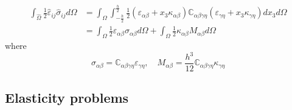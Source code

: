 \documentclass{article}
\begin{document}
\begin{equation}
    \begin{split}
        \int_{\hat \Omega}\frac{1}{2}\hat \varepsilon_{ij} \hat \sigma_{ij} d\Omega &= \int_{\Omega}\int_{-\frac{h}{2}}^{\frac{h}{2}}\frac{1}{2}(\varepsilon_{\alpha \beta} + x_3 \kappa_{\alpha \beta})\mathbb{C}_{\alpha \beta \gamma \eta}(\varepsilon_{\gamma \eta} + x_3 \kappa_{\gamma \eta})dx_3 d\Omega \\
        &= \int_{\Omega} \frac{1}{2}\varepsilon_{\alpha \beta} \sigma_{\alpha \beta} d\Omega + \int_{\Omega} \frac{1}{2} \kappa_{\alpha \beta} M_{\alpha \beta} d\Omega
    \end{split}
\end{equation}
where
\begin{equation}
    \sigma_{\alpha \beta} = \mathbb{C}_{\alpha \beta \gamma \eta} \varepsilon_{\gamma \eta}, \quad M_{\alpha \beta} = \frac{h^3}{12} \mathbb{C}_{\alpha \beta \gamma \eta} \kappa_{\gamma \eta}
\end{equation}

\subsection{Elasticity problems}
\end{document}
